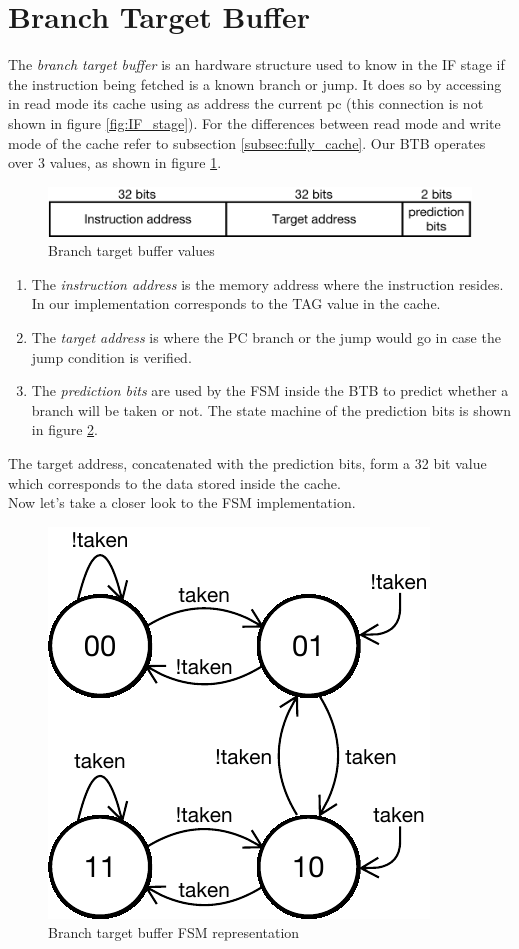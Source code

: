 \section{Branch Target Buffer}

The {\it branch target buffer} is an hardware structure used to know in the IF stage if the instruction being fetched is a known branch or jump.
It does so by accessing in read mode its cache using as address the current pc (this connection is not shown in figure \ref{fig:IF_stage}). For the differences
between read mode and write mode of the cache refer to subsection \ref{subsec:fully_cache}.
Our BTB operates over 3 values, as shown in figure \ref{fig:BTB_fields}.

\begin{figure}[!ht]
    \centering
    \includegraphics[width=\linewidth]{./chapters/figures/BTB_fields.pdf}
	\caption{Branch target buffer values}
	\label{fig:BTB_fields}
\end{figure}

\begin{enumerate}
    \item The {\it instruction address} is the memory address where the instruction resides. In our implementation corresponds to the TAG value in the cache.
    \item The {\it target address} is where the PC branch or the jump would go in case the jump condition is verified.
    \item The {\it prediction bits} are used by the FSM inside the BTB to predict whether a branch will be taken or not. The state machine of the prediction bits is shown in figure \ref{fig:BTB_FSM}.
\end{enumerate}

The target address, concatenated with the prediction bits, form a 32 bit value which corresponds to the data stored inside the cache.\\
Now let's take a closer look to the FSM implementation.

\begin{figure}[!ht]
	\centering
	\includegraphics[width=0.3\linewidth]{./chapters/figures/BTB_FSM.pdf}
    \caption{Branch target buffer FSM representation}
    \label{fig:BTB_FSM}
\end{figure}

